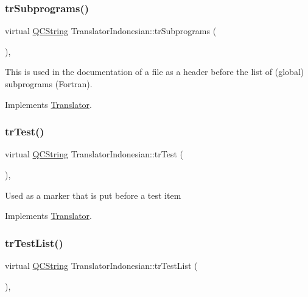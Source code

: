 \subsubsection{\texorpdfstring{trSubprograms()}{trSubprograms()}}
{\footnotesize\ttfamily virtual \mbox{\hyperlink{class_q_c_string}{Q\+C\+String}} Translator\+Indonesian\+::tr\+Subprograms (\begin{DoxyParamCaption}{ }\end{DoxyParamCaption})\hspace{0.3cm}{\ttfamily [inline]}, {\ttfamily [virtual]}}

This is used in the documentation of a file as a header before the list of (global) subprograms (Fortran). 

Implements \mbox{\hyperlink{class_translator}{Translator}}.

\mbox{\label{class_translator_indonesian_abb29f30b011a3c60c35414f2d3de5f57}} 
\subsubsection{\texorpdfstring{trTest()}{trTest()}}
{\footnotesize\ttfamily virtual \mbox{\hyperlink{class_q_c_string}{Q\+C\+String}} Translator\+Indonesian\+::tr\+Test (\begin{DoxyParamCaption}{ }\end{DoxyParamCaption})\hspace{0.3cm}{\ttfamily [inline]}, {\ttfamily [virtual]}}

Used as a marker that is put before a test item 

Implements \mbox{\hyperlink{class_translator}{Translator}}.

\mbox{\label{class_translator_indonesian_a93e4cbdab3457bf6313152aa16665a3c}} 
\subsubsection{\texorpdfstring{trTestList()}{trTestList()}}
{\footnotesize\ttfamily virtual \mbox{\hyperlink{class_q_c_string}{Q\+C\+String}} Translator\+Indonesian\+::tr\+Test\+List (\begin{DoxyParamCaption}{ }\end{DoxyParamCaption})\hspace{0.3cm}{\ttfamily [inline]}, {\ttfamily [virtual]}}

